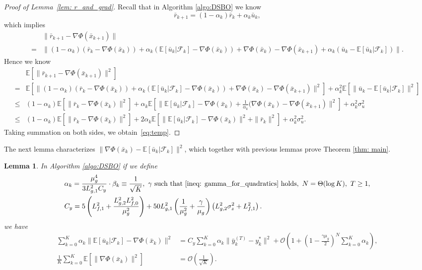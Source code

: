 \documentclass{article}
\theoremstyle{plain}
\newtheorem{lemma}[theorem]{Lemma}
\theoremstyle{definition}
\theoremstyle{remark}
\newcommand{\E}{\mathbb{E}}
\newcommand{\F}{\mathcal{F}}
\newcommand{\cO}{\mathcal{O}}
\begin{document}
\begin{proof}[Proof of Lemma~\ref{lem: r_and_grad}]
    Recall that in Algorithm \ref{algo:DSBO} we know
    \[
        \bar{r}_{k+1} = (1-\alpha_k)\bar{r}_k + \alpha_k\bar{u}_k,
    \]
    which implies 
    \begin{align*}
        &\|\bar{r}_{k+1} - \nabla\Phi(\bar{x}_{k+1})\| \\
        = &\|(1-\alpha_k)(\bar{r}_k -\nabla\Phi(\bar{x}_k)) + \alpha_k(\E\left[\bar{u}_k|\F_k\right] - \nabla\Phi(\bar{x}_k)) + \nabla\Phi(\bar{x}_k) - \nabla\Phi(\bar{x}_{k+1}) + \alpha_k(\bar{u}_k -\E\left[\bar{u}_k|\F_k\right])\|.
    \end{align*}
    Hence we know
    \begin{align*}
        &\E\left[\|\bar{r}_{k+1} - \nabla\Phi(\bar{x}_{k+1})\|^2\right] \\
        =&\E\left[\|(1-\alpha_k)(\bar{r}_k -\nabla\Phi(\bar{x}_k)) + \alpha_k(\E\left[\bar{u}_k|\F_k\right] - \nabla\Phi(\bar{x}_k)) + \nabla\Phi(\bar{x}_k) - \nabla\Phi(\bar{x}_{k+1})\|^2\right] + \alpha_k^2\E\left[\|\bar{u}_k -\E\left[\bar{u}_k|\F_k\right]\|^2\right]\\
        \leq & (1-\alpha_k)\E\left[\|\bar{r}_k -\nabla\Phi(\bar{x}_k)\|^2\right] + \alpha_k\E\left[\|\E\left[\bar{u}_k|\F_k\right] - \nabla\Phi(\bar{x}_k) + \frac{1}{\alpha_k}(\nabla\Phi(\bar{x}_k) - \nabla\Phi(\bar{x}_{k+1})\|^2\right] + \alpha_k^2\sigma_u^2 \\
        \leq &(1-\alpha_k)\E\left[\|\bar{r}_k -\nabla\Phi(\bar{x}_k)\|^2\right] + 2\alpha_k\E\left[\|\E\left[\bar{u}_k|\F_k\right] - \nabla\Phi(\bar{x}_k)\|^2 + \|\bar{r}_k\|^2\right]+ \alpha_k^2\sigma_u^2.
    \end{align*}
    Taking summation on both sides, we obtain~\eqref{eq:temp}.
\end{proof}
The next lemma characterizes $\|\nabla\Phi(\bar{x}_k) - \E\left[\bar{u}_k|\F_k\right]\|^2$, which together with previous lemmas prove Theorem \ref{thm: main}.
\begin{lemma}\label{lem: last}
    In Algorithm \ref{algo:DSBO} if we define
    \begin{align*}
        &\alpha_k = \frac{\mu_g^4}{3L_{g,1}^2C_y}\cdot\beta_k \equiv \frac{1}{\sqrt{K}},\ \gamma \text{ such that \eqref{ineq: gamma_for_quadratics} holds},\  N = \Theta(\log K),\ T\geq 1, \\
        &C_y = 5\left(L_{f,1}^2 + \frac{L_{g,2}^2L_{f,0}^2}{\mu_g^2}\right) + 50L_{g,1}^2\left(\frac{1}{\mu_g^2} + \frac{\gamma}{\mu_g}\right)\left(L_{g,2}^2\sigma_z^2 + L_{f,1}^2\right).
    \end{align*}
    we have
    \begin{align*}
        \sum_{k=0}^{K}\alpha_k\|\E\left[\bar{u}_k|\F_k\right] - \nabla\Phi(\bar{x}_k)\|^2 &= C_y\sum_{k=0}^{K}\alpha_k\|\bar{y}_k^{(T)} - y_k^*\|^2 + \cO\left(1 + \left(1-\frac{\gamma\mu_g}{2}\right)^{N}\sum_{k=0}^{K}\alpha_k\right), \\ 
        \frac{1}{K}\sum_{k=0}^{K}\E\left[\|\nabla\Phi(\bar{x}_k)\|^2\right] &= \cO\left(\frac{1}{\sqrt{K}}\right).
    \end{align*}
\end{lemma}
\end{document}
